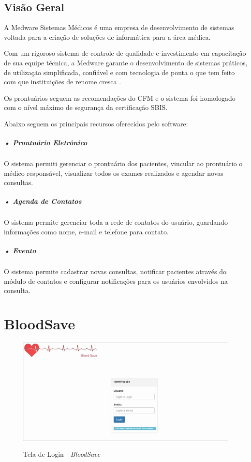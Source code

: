 \documentclass[portuguese,oneside]{tcc}
\begin{document}
\subsection{Visão Geral}

A Medware Sistemas Médicos é uma empresa de desenvolvimento de sistemas voltada para a criação de soluções de informática para a área médica.

Com um rigoroso sistema de controle de qualidade e investimento em capacitação de sua equipe técnica, a Medware garante o desenvolvimento de sistemas práticos, de utilização simplificada, confiável e com tecnologia de ponta o que tem feito com que instituições de renome cresca \cite{MEDWARE}.

Os prontuários seguem as recomendações do CFM e o sistema foi homologado com o nível máximo de segurança da certificação SBIS.

Abaixo seguem os principais recursos oferecidos pelo software:

\subparagraph{• Prontuário Eletrônico}
O sistema permiti gerenciar o prontuário dos pacientes, vincular ao prontuário o médico responsável, visualizar todos os exames realizados e agendar novas consultas.

\subparagraph{• Agenda de Contatos}
O sistema permite gerenciar toda a rede de contatos do usuário, guardando informações como nome, e-mail e telefone para contato.

\subparagraph{• Evento}
O sistema permite cadastrar novas consultas, notificar pacientes através do módulo de contatos e configurar notificações para os usuários envolvidos na consulta.


\newpage

\section{BloodSave}

\begin{figure}[htp]
\centering
\caption{Tela de Login - \textit{BloodSave}}
\includegraphics[width=15cm]{bloodsave}
\label{fig:bloodsave}
\end{figure}
\end{document}
